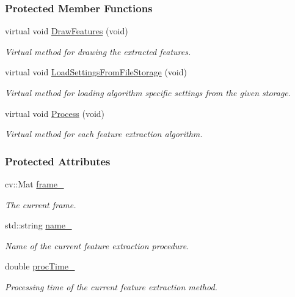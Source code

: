 \subsubsection*{Protected Member Functions}
\begin{DoxyCompactItemize}
\item 
virtual void \hyperlink{group___feature_extractor_afcc4cc593c475cd67068c535e5bb4108}{Draw\-Features} (void)
\begin{DoxyCompactList}\small\item\em Virtual method for drawing the extracted features. \end{DoxyCompactList}\item 
virtual void \hyperlink{group___feature_extractor_afcf9f70e2258f918ae0f18ab78d77992}{Load\-Settings\-From\-File\-Storage} (void)
\begin{DoxyCompactList}\small\item\em Virtual method for loading algorithm specific settings from the given storage. \end{DoxyCompactList}\item 
virtual void \hyperlink{group___feature_extractor_ad9e3aebe506fc936c6ad18f9fc9543db}{Process} (void)
\begin{DoxyCompactList}\small\item\em Virtual method for each feature extraction algorithm. \end{DoxyCompactList}\end{DoxyCompactItemize}
\subsubsection*{Protected Attributes}
\begin{DoxyCompactItemize}
\item 
cv\-::\-Mat \hyperlink{group___feature_extractor_aa805e6fee8eeec2061feabe29430f0df}{frame\-\_\-}
\begin{DoxyCompactList}\small\item\em The current frame. \end{DoxyCompactList}\item 
std\-::string \hyperlink{group___feature_extractor_a46e9fc1f327aaafb10de2c0425d311aa}{name\-\_\-}
\begin{DoxyCompactList}\small\item\em Name of the current feature extraction procedure. \end{DoxyCompactList}\item 
double \hyperlink{group___feature_extractor_a1b176bd48aad30b553e0f87f0264c3d0}{proc\-Time\-\_\-}
\begin{DoxyCompactList}\small\item\em Processing time of the current feature extraction method. \end{DoxyCompactList}\end{DoxyCompactItemize}
